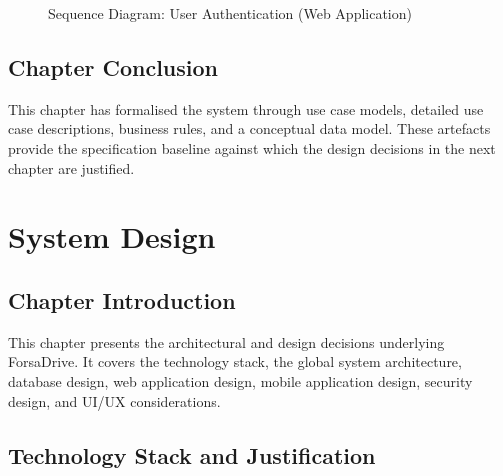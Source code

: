 \documentclass[12pt,a4paper,openright]{report}
\begin{document}
\begin{figure}[H]
\centering
{}
\caption{Sequence Diagram: User Authentication (Web Application)}
\label{fig:seq-auth}
\end{figure}

\section*{Chapter Conclusion}

This chapter has formalised the system through use case models, detailed use case descriptions, business rules, and a conceptual data model. These artefacts provide the specification baseline against which the design decisions in the next chapter are justified.

\chapter{System Design}

\section*{Chapter Introduction}
This chapter presents the architectural and design decisions underlying ForsaDrive. It covers the technology stack, the global system architecture, database design, web application design, mobile application design, security design, and UI/UX considerations.

\section{Technology Stack and Justification}
\end{document}
